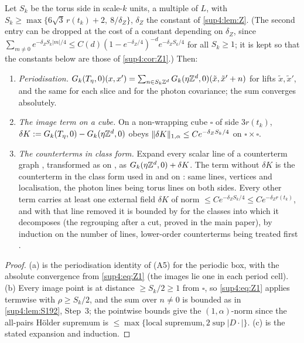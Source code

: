 \begin{lemma}\label{sup4:lem:F2}
Let $S_k$ be the torus side in scale-$k$ units, a multiple of $L$, with $S_k\ge\max\{6\sqrt3\,r(t_k)+2,\ 8/\delta_Z\}$, $\delta_Z$ the constant of \cref{sup4:lem:Z}. (The second entry can be dropped at the cost of a constant depending on $\delta_Z$, since $\sum_{m\ne0}e^{-\delta_ZS_k|m|/4}\le C(d)(1-e^{-\delta_Z/4})^{-d}e^{-\delta_ZS_k/4}$ for all $S_k\ge1$; it is kept so that the constants below are those of \cref{sup4:cor:Z1}.) Then:
\begin{enumerate}[label=\textup{(\alph*)},nosep,leftmargin=*]
\item \emph{Periodisation.} $G_k(T_\eta,0)(x,x')=\sum_{n\in S_k\mathbb Z^d}G_k(\eta\mathbb Z^d,0)(\tilde x,\tilde x'+n)$ for lifts $\tilde x,\tilde x'$, and the same for each slice and for the photon covariance; the sum converges absolutely.
\item \emph{The image term on a cube.} On a non-wrapping cube $\square$ of side $3r(t_k)$, $\delta K:= G_k(T_\eta,0)-G_k(\eta\mathbb Z^d,0)$ obeys $\lVert \delta K\rVert_{1,\alpha}\le Ce^{-\delta_ZS_k/4}$ on $\square\times\square$.
\item \emph{The counterterms in class form.} Expand every scalar line of a counterterm graph \cite[(1.26)--(1.31)]{Ba3}, transformed as on \cite[p.~433]{Ba3}, as $G_k(\eta\mathbb Z^d,0)+\delta K$. The term without $\delta K$ is the counterterm in the class form used in \cite[(3.7)--(3.9), (3.19)]{Ba3} and on \cite[pp.~444--445]{Ba3}: same lines, vertices and localisation, the photon lines being torus lines on both sides. Every other term carries at least one external field $\delta K$ of norm $\le Ce^{-\delta_ZS_k/4}\le Ce^{-\delta_Zr(t_k)}$, and with that line removed it is bounded by \cite[(3.3)]{Ba3} for the classes into which it decomposes (the regrouping after a cut, proved in the main paper), by induction on the number of lines, lower-order counterterms being treated first \cite[p.~417]{Ba3}.
\end{enumerate}
\end{lemma}

\begin{proof}
(a) is the periodisation identity of (A5) for the periodic box, with the absolute convergence from \eqref{sup4:eq:Z1} (the images lie one in each period cell). (b) Every image point is at distance $\ge S_k/2\ge1$ from $\square$, so \eqref{sup4:eq:Z1} applies termwise with $\rho\ge S_k/2$, and the sum over $n\ne0$ is bounded as in \cref{sup4:lem:S192}, Step~3; the pointwise bounds give the $(1,\alpha)$-norm since the all-pairs H\"older supremum is $\le\max\{\text{local supremum},2\sup|D\cdot|\}$. (c) is the stated expansion and induction.
\end{proof}

